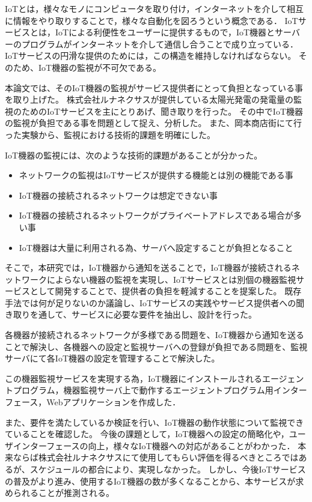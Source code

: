 IoTとは，様々なモノにコンピュータを取り付け，インターネットを介して相互に情報をやり取りすることで，様々な自動化を図ろうという概念である．
IoTサービスとは，IoTによる利便性をユーザーに提供するもので，IoT機器とサーバーのプログラムがインターネットを介して通信し合うことで成り立っている．
IoTサービスの円滑な提供のためには，この構造を維持しなければならない。
そのため、IoT機器の監視が不可欠である。
\medskip

本論文では、そのIoT機器の監視がサービス提供者にとって負担となっている事を取り上げた。
株式会社ルナネクサスが提供している太陽光発電の発電量の監視のためのIoTサービスを主にとりあげ、聞き取りを行った。
その中でIoT機器の監視が負担である事を問題として捉え、分析した。
また、岡本商店街にて行った実験から、監視における技術的課題を明確にした。

IoT機器の監視には、次のような技術的課題があることが分かった。
\begin{itemize}
\item ネットワークの監視はIoTサービスが提供する機能とは別の機能である事
\item IoT機器の接続されるネットワークは想定できない事
\item IoT機器の接続されるネットワークがプライベートアドレスである場合が多い事
\item IoT機器は大量に利用される為、サーバへ設定することが負担となること
\end{itemize}
\medskip

そこで，本研究では，IoT機器から通知を送ることで，IoT機器が接続されるネットワークによらない機器の監視を実現し、IoTサービスとは別個の機器監視サービスとして開発することで、提供者の負担を軽減することを提案した。
既存手法では何が足りないのか議論し、IoTサービスの実践やサービス提供者への聞き取りを通して、サービスに必要な要件を抽出し、設計を行った。

各機器が接続されるネットワークが多様である問題を、IoT機器から通知を送ることで解決し、各機器への設定と監視サーバへの登録が負担である問題を、監視サーバにて各IoT機器の設定を管理することで解決した。

この機器監視サービスを実現する為，IoT機器にインストールされるエージェントプログラム，機器監視サーバ上で動作するエージェントプログラム用インターフェース，Webアプリケーションを作成した．
\medskip

また、要件を満たしているか検証を行い、IoT機器の動作状態について監視できていることを確認した。
今後の課題として，IoT機器への設定の簡略化や，ユーザインターフェースの向上，様々なIoT機器への対応があることがわかった．
本来ならば株式会社ルナネクサスにて使用してもらい評価を得るべきところではあるが、スケジュールの都合により、実現しなかった。
しかし、今後IoTサービスの普及がより進み、使用するIoT機器の数が多くなることから、本サービスが求められることが推測される。

